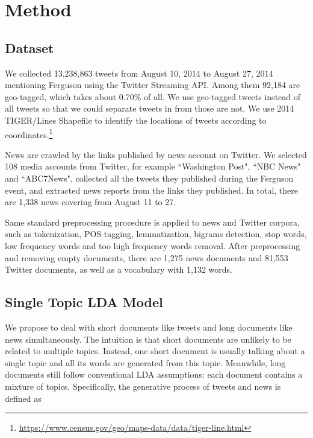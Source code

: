 \section{Method}
\label{sec:model}

\subsection{Dataset}
\label{subsec:dat}
We collected 13,238,863 tweets from August 10, 2014 to August 27, 2014 mentioning Ferguson using the Twitter Streaming API. Among them 92,184 are geo-tagged, which takes about 0.70\% of all. We use geo-tagged tweets instead of all tweets so that we could separate tweets in \stlouis from those are not. We use 2014 TIGER/Lines Shapefile to identify the locations of tweets according to coordinates.\footnote{\url{https://www.census.gov/geo/maps-data/data/tiger-line.html}}

News are crawled by the links published by news account on Twitter. We selected 108 media accounts from Twitter, for example ``Washington Post", ``NBC News" and ``ABC7News", collected all the tweets they published during the Ferguson event, and extracted news reports from the links they published. In total, there are 1,338 news covering from August 11 to 27.

Same standard preprocessing procedure is applied to news and Twitter corpora, such as tokenization, POS tagging, lemmatization, bigrams detection, stop words, low frequency words and too high frequency words removal. After preprocessing and removing empty documents, there are 1,275 news documents and 81,553 Twitter documents, as well as a vocabulary with 1,132 words.


\subsection{Single Topic LDA Model}

We propose \stlda to deal with short documents like tweets and long documents like news simultaneously. The intuition is that short documents are unlikely to be related to multiple topics. Instead, one short document is usually talking about a single topic and all its words are generated from this topic. Meanwhile, long documents still follow conventional LDA assumptions: each document contains a mixture of topics. Specifically, the generative process of tweets and news is defined as

